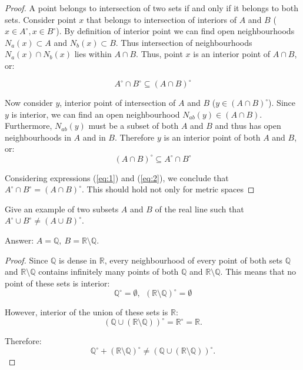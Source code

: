 \documentclass{article}
\newcommand{\R}{\mathbb{R}}
\newcommand{\Q}{\mathbb{Q}}
\begin{document}
\begin{proof}

A point belongs to intersection of two sets if and only if it belongs to both sets. 
Consider point $x$ that belongs to intersection of interiors of $A$ and $B$ ($x \in A^\circ, x \in B^\circ$).
By definition of interior point we can find open neighbourhoods $N_a(x) \subset A$ and $N_b(x) \subset B$.
Thus intersection of neighbourhoods $N_a(x) \cap N_b(x)$ lies within $A \cap B$.
Thus, point $x$ is an interior point of $A \cap B$, or:

\begin{equation} \label{eq:1}
    A^\circ \cap B^\circ \subseteq (A \cap B)^\circ
\end{equation}

Now consider $y$, interior point of intersection of $A$ and $B$ ($y \in (A \cap B)^\circ$).
Since $y$ is interior, we can find an open neighbourhood $N_{ab}(y) \in (A \cap B)$. 
Furthermore, $N_{ab}(y)$ must be a subset of both $A$ and $B$ and thus has open neighbourhoods in $A$ and in $B$.
Therefore $y$ is an interior point of both $A$ and $B$, or:
\begin{equation} \label{eq:2}
(A \cap B)^\circ \subseteq A^\circ \cap B^\circ
\end{equation}

Considering expressions (\ref{eq:1}) and (\ref{eq:2}), we conclude that
$ A^\circ \cap B^\circ = (A \cap B)^\circ $.
This should hold not only for metric spaces

\end{proof}

\begin{tcolorbox}
Give an example of two subsets $A$ and $B$ of the real line such that
$A^\circ \cup B^\circ \neq (A \cup B)^\circ $.
\end{tcolorbox}

Answer: $A = \Q, \> B = \R \setminus \Q$.

\begin{proof}

Since $\Q$ is dense in $\R$, every neighbourhood of every point of both sets $\Q$ and $\R \setminus \Q$ contains infinitely many points of both $\Q$ and $\R \setminus \Q$.
This means that no point of these sets is interior:
\[ \Q^\circ = \emptyset, \>\> (\R \setminus \Q)^\circ = \emptyset \]

However, interior of the union of these sets is $\R$:
\[ (\Q \cup (\R \setminus \Q))^\circ = \R^\circ = \R. \]

Therefore:
\[ \Q^\circ + (\R \setminus \Q)^\circ \neq (\Q \cup (\R \setminus \Q))^\circ. \]

\end{proof}
\end{document}
